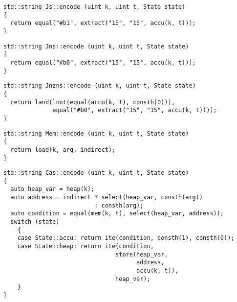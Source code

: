 
\begin{lstlisting}[style=c++, style=encode]
std::string Js::encode (uint k, uint t, State state)
{
  return equal("#b1", extract("15", "15", accu(k, t)));
}
\end{lstlisting}


\newpage

\begin{lstlisting}[style=c++, style=encode]
std::string Jns::encode (uint k, uint t, State state)
{
  return equal("#b0", extract("15", "15", accu(k, t)));
}
\end{lstlisting}


\begin{lstlisting}[style=c++, style=encode]
std::string Jnzns::encode (uint k, uint t, State state)
{
  return land(lnot(equal(accu(k, t), consth(0))),
              equal("#b0", extract("15", "15", accu(k, t))));
}
\end{lstlisting}


\begin{lstlisting}[style=c++, style=encode]
std::string Mem::encode (uint k, uint t, State state)
{
  return load(k, arg, indirect);
}
\end{lstlisting}


\begin{lstlisting}[style=c++, style=encode]
std::string Cas::encode (uint k, uint t, State state)
{
  auto heap_var = heap(k);
  auto address = indirect ? select(heap_var, consth(arg))
                          : consth(arg);
  auto condition = equal(mem(k, t), select(heap_var, address));
  switch (state)
    {
    case State::accu: return ite(condition, consth(1), consth(0));
    case State::heap: return ite(condition,
                                store(heap_var,
                                      address,
                                      accu(k, t)),
                                heap_var);
    }
}
\end{lstlisting}

